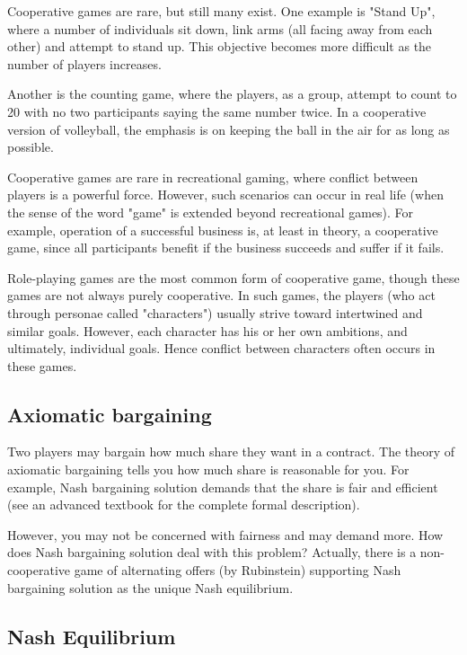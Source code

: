 Cooperative games are rare, but still many exist. One example is "Stand Up", where a number of individuals sit down, link arms (all facing away from each other) and attempt to stand up. This objective becomes more difficult as the number of players increases.

Another is the counting game, where the players, as a group, attempt to count to 20 with no two participants saying the same number twice. In a cooperative version of volleyball, the emphasis is on keeping the ball in the air for as long as possible.

Cooperative games are rare in recreational gaming, where conflict between players is a powerful force. However, such scenarios can occur in real life (when the sense of the word "game" is extended beyond recreational games). For example, operation of a successful business is, at least in theory, a cooperative game, since all participants benefit if the business succeeds and suffer if it fails.

Role-playing games are the most common form of cooperative game, though these games are not always purely cooperative. In such games, the players (who act through personae called "characters") usually strive toward intertwined and similar goals. However, each character has his or her own ambitions, and ultimately, individual goals. Hence conflict between characters often occurs in these games.

\subsection{Axiomatic bargaining}
Two players may bargain how much share they want in a contract. The theory of axiomatic bargaining tells you how much share is reasonable for you. For example, Nash bargaining solution demands that the share is fair and efficient (see an advanced textbook for the complete formal description).

However, you may not be concerned with fairness and may demand more. How does Nash bargaining solution deal with this problem? Actually, there is a non-cooperative game of alternating offers (by Rubinstein) supporting Nash bargaining solution as the unique Nash equilibrium.


\subsection{Nash Equilibrium}

